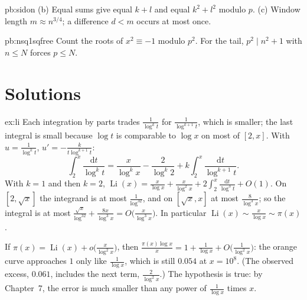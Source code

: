 \begin{hint}{pb:sidon}
(b) Equal sums give equal $k+l$ and equal $k^2+l^2$ modulo $p$. (c) Window length $m\approx n^{3/4}$; a difference $d<m$ occurs at
most once.
\end{hint}

\begin{hint}{pb:nsq1sqfree}
Count the roots of $x^2\equiv-1$ modulo $p^2$. For the tail, $p^2\mid n^2+1$ with $n\le N$ forces $p\le N$.
\end{hint}

\section{Solutions}

\begin{solution}{ex:li}
\idea Each integration by parts trades $\frac1{\log^kt}$ for $\frac1{\log^{k+1}t}$, which is smaller; the last integral is small because $\log t$ is comparable to $\log x$ on most of $[2,x]$.
\writeup With $u=\frac1{\log^kt}$, $u'=-\frac k{t\log^{k+1}t}$:
\[
\int_2^x\frac{\mathrm dt}{\log^kt}=\frac x{\log^kx}-\frac2{\log^k2}+k\int_2^x\frac{\mathrm dt}{\log^{k+1}t}.
\]
With $k=1$ and then $k=2$, $\operatorname{Li}(x)=\frac x{\log x}+\frac x{\log^2x}+2\int_2^x\frac{\mathrm dt}{\log^3t}+O(1)$. On $[2,\sqrt x]$ the integrand is at most $\frac1{\log^32}$, and on $[\sqrt x,x]$ at most
$\frac8{\log^3x}$; so the integral is at most $\frac{\sqrt x}{\log^32}+\frac{8x}{\log^3x}=O\bigl(\frac x{\log^3x}\bigr)$. In particular $\operatorname{Li}(x)\sim\frac x{\log x}\sim\pi(x)$.

If $\pi(x)=\operatorname{Li}(x)+o\bigl(\frac x{\log^2x}\bigr)$, then $\frac{\pi(x)\log x}x=1+\frac1{\log x}+O\bigl(\frac1{\log^2x}\bigr)$: the orange curve approaches $1$ only like $\frac1{\log x}$, which is still
$0.054$ at $x=10^8$. (The observed excess, $0.061$, includes the next term, $\frac2{\log^2x}$.) The hypothesis is true: by Chapter~7, the error is much smaller than any power of $\frac1{\log x}$ times $x$.
\end{solution}

